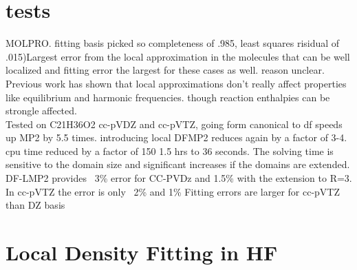 \documentclass[10pt, draft]{article}
\begin{document}
	\section{tests}
	MOLPRO. fitting basis picked so completeness of .985, least squares risidual of .015)Largest error from the local approximation in the molecules that can be well localized and fitting error the largest for these cases as well.  reason unclear.  Previous work has shown that local approximations don't really affect properties like equilibrium and harmonic frequencies.  though reaction enthalpies can be strongle affected.  \\
	Tested on C21H36O2 cc-pVDZ and cc-pVTZ, going form canonical to df speeds up MP2 by 5.5 times. introducing local DFMP2 reduces again by a factor of 3-4.  cpu time reduced by a factor of 150  1.5 hrs to 36 seconds.  The solving time is sensitive to the domain size and significant increases if the domains are extended.  DF-LMP2 provides ~3\% error for CC-PVDz and 1.5\% with the extension to R=3.  In cc-pVTZ the error is only ~2\% and 1\% Fitting errors are larger for cc-pVTZ than DZ basis 
	
	\section{Local Density Fitting in HF}
	
	 
	
\end{document}
